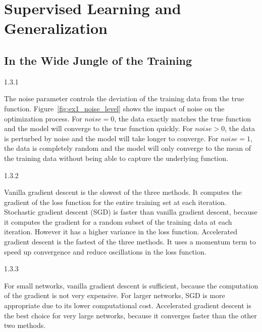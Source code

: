 
\section{Supervised Learning and Generalization}
\label{ex:1}


\setcounter{subsection}{2}
\subsection{In the Wide Jungle of the Training}
\label{ex:1.3}


\begin{task}{1.3.1}
\end{task}

The noise parameter controls the deviation of the training data from the true function.
Figure~\ref{fig:ex1_noise_level} shows the impact of noise on the optimization process. For $noise =
  0$, the data exactly matches the true function and the model will converge to the true function
quickly. For $noise > 0$, the data is perturbed by noise and the model will take longer to converge.
For $noise = 1$, the data is completely random and the model will only converge to the mean of the
training data without being able to capture the underlying function.


\begin{task}{1.3.2}
\end{task}

Vanilla gradient descent is the slowest of the three methods. It computes the gradient of the loss
function for the entire training set at each iteration. Stochastic gradient descent (SGD) is faster
than vanilla gradient descent, because it computes the gradient for a random subset of the training
data at each iteration. However it has a higher variance in the loss function. Accelerated gradient
descent is the fastest of the three methods. It uses a momentum term to speed up convergence and
reduce oscillations in the loss function.


\begin{task}{1.3.3}
\end{task}

For small networks, vanilla gradient descent is sufficient, because the computation of the gradient
is not very expensive. For larger networks, SGD is more appropriate due to its lower computational
cost. Accelerated gradient descent is the best choice for very large networks, because it converges
faster than the other two methods.


